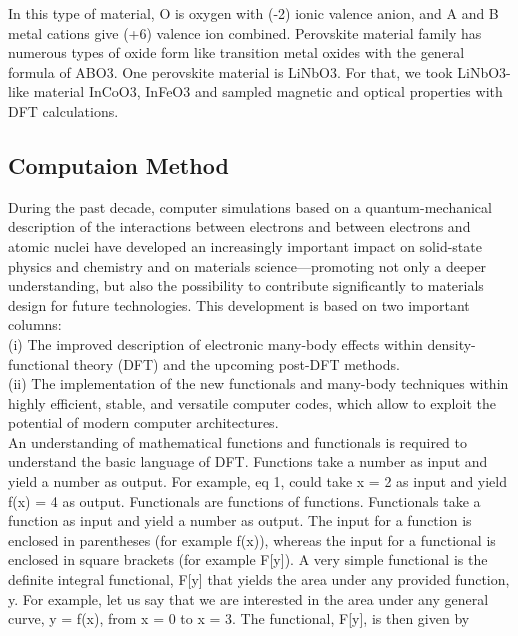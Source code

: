\documentclass[12pt, letterpaper]{article}
\newcommand*{\1}{\hspace{1pt}}
\begin{document}
    In this type of material, O is oxygen with (-2) ionic valence anion, and A and B metal 
    cations give (+6) valence ion combined. Perovskite material family has numerous types of oxide form like transition metal oxides with the general formula of ABO3\cite{r2}.
    One perovskite material is LiNbO3. For that, we took LiNbO3-like material InCoO3, InFeO3 and sampled magnetic and optical properties with DFT calculations\cite{r3}. 
    
    \subsection*{Computaion Method}
    During the past decade, computer simulations based on a quantum-mechanical description of the interactions between electrons 
    and between electrons and atomic nuclei have developed an increasingly important impact on solid-state physics and chemistry 
    and on materials science—promoting not only a deeper understanding, but also the possibility to contribute significantly to 
    materials design for future technologies. This development is based on two important columns: \\
    
    (i) The improved description of electronic many-body effects within density-functional theory (DFT) and the upcoming post-DFT 
    methods. \\ 
    (ii) The implementation of the new functionals and many-body techniques within highly efficient, stable, and versatile 
    computer codes, which allow to exploit the potential of modern computer architectures. \\ 

    An understanding of mathematical functions and functionals is
    required to understand the basic language of DFT. Functions
    take a number as input and yield a number as output. For
    example, eq 1, could take x = 2 as input and yield f(x) = 4 as
    output. Functionals are functions of functions. Functionals take
    a function as input and yield a number as output. The input for
    a function is enclosed in parentheses (for example f(x)),
    whereas the input for a functional is enclosed in square brackets
    (for example F[y]). A very simple functional is the deﬁnite
    integral functional, F[y] that yields the area under any provided
    function, y. For example, let us say that we are interested in the
    area under any general curve, y = f(x), from x = 0 to x = 3. The
    functional, F[y], is then given by 
    
\end{document}
